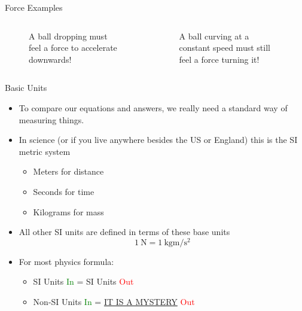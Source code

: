 \documentclass[pdf, aspectratio=169]{beamer}
\begin{document}
\begin{frame}{Force Examples}
  \begin{columns}
	\begin{figure}[h!]
	  \centering
	  \caption*{A ball dropping must feel a force to accelerate downwards!}
	\end{figure}
	\begin{figure}[h!]
	  \centering
	  \caption*{A ball curving at a constant speed must still feel a force turning it!}
	\end{figure}
  \end{columns}
\end{frame}

\begin{frame}{Basic Units}
  \begin{itemize}
	\item To compare our equations and answers, we really need a standard way of measuring things.
	\item In science (or if you live anywhere besides the US or England) this is the SI metric system
	  \begin{itemize}
		\item \alert{Meters} for distance
		\item \alert{Seconds} for time
		\item \alert{Kilograms} for mass
	  \end{itemize}
	\item All other SI units are defined in terms of these base units
	  \[\SI{1}{\newton} = \SI{1}{\kilo\gram\meter\per\second^2}\]
	\item For most physics formula:
	  \begin{itemize}
		\item SI Units \textcolor{green}{In} = SI Units \textcolor{red}{Out}
		\item Non-SI Units \textcolor{green}{In} = \underline{IT IS A MYSTERY} \textcolor{red}{Out}
	  \end{itemize}
  \end{itemize}
\end{frame}
\end{document}
